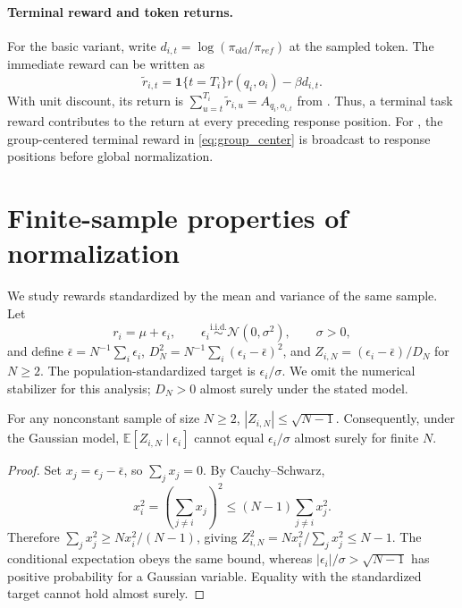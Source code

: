 \paragraph{Terminal reward and token returns.}
For the basic variant, write $d_{i,t}=\log(\pi_{\mathrm{old}}/\pi_{ref})$ at the sampled token. The immediate reward can be written as
\begin{equation}
 \widetilde r_{i,t}=\mathbf{1}\{t=T_i\}r(q_i,o_i)-\beta d_{i,t}.
\end{equation}
With unit discount, its return is $\sum_{u=t}^{T_i}\widetilde r_{i,u}=A_{q_i,o_{i,t}}$ from . Thus, a terminal task reward contributes to the return at every preceding response position. For \varn, the group-centered terminal reward in \cref{eq:group_center} is broadcast to response positions before global normalization.


\section{Finite-sample properties of normalization}\label{appendix:normalization}\label{appendix:proof_GRPO}
We study rewards standardized by the mean and variance of the same sample. Let
\begin{equation}
 r_i=\mu+\epsilon_i,\qquad \epsilon_i\overset{\mathrm{i.i.d.}}{\sim}\mathcal N(0,\sigma^2),\qquad \sigma>0,
\end{equation}
and define $\bar\epsilon=N^{-1}\sum_i\epsilon_i$,
$D_N^2=N^{-1}\sum_i(\epsilon_i-\bar\epsilon)^2$, and
$Z_{i,N}=(\epsilon_i-\bar\epsilon)/D_N$ for $N\geq2$. The population-standardized target is $\epsilon_i/\sigma$. We omit the numerical stabilizer for this analysis; $D_N>0$ almost surely under the stated model.

\begin{proposition}\label{prop:bound}
For any nonconstant sample of size $N\geq2$, $|Z_{i,N}|\leq\sqrt{N-1}$.
Consequently, under the Gaussian model, $\mathbb{E}[Z_{i,N}\mid\epsilon_i]$ cannot equal $\epsilon_i/\sigma$ almost surely for finite $N$.
\end{proposition}
\begin{proof}
Set $x_j=\epsilon_j-\bar\epsilon$, so $\sum_jx_j=0$. By Cauchy--Schwarz,
\begin{equation}
 x_i^2=\left(\sum_{j\ne i}x_j\right)^2
 \leq(N-1)\sum_{j\ne i}x_j^2.
\end{equation}
Therefore $\sum_jx_j^2\geq Nx_i^2/(N-1)$, giving
$Z_{i,N}^2=Nx_i^2/\sum_jx_j^2\leq N-1$.
The conditional expectation obeys the same bound, whereas
$|\epsilon_i|/\sigma>\sqrt{N-1}$ has positive probability for a Gaussian variable. Equality with the standardized target cannot hold almost surely.
\end{proof}

